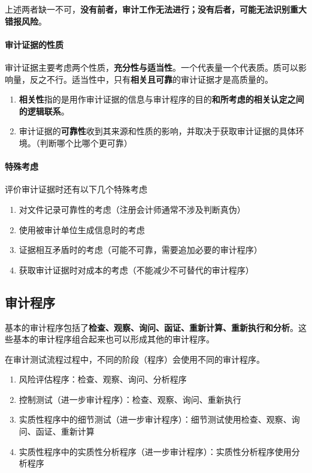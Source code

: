 \documentclass[UTF8,12pt]{ctexart}
\numberwithin{equation}{section} %
\numberwithin{figure}{section}
\numberwithin{table}{section}
\begin{document}
	上述两者缺一不可，\textbf{没有前者，审计工作无法进行；没有后者，可能无法识别重大错报风险}。
	
	\paragraph{审计证据的性质}审计证据主要考虑两个性质，\textbf{充分性与适当性}。一个代表量一个代表质。质可以影响量，反之不行。适当性中，只有\textbf{相关且可靠}的审计证据才是高质量的。
	\begin{enumerate}
		\item \textbf{相关性}指的是用作审计证据的信息与审计程序的目的\textbf{和所考虑的相关认定之间的逻辑联系}。
		
		\item 审计证据的\textbf{可靠性}收到其来源和性质的影响，并取决于获取审计证据的具体环境。（判断哪个比哪个更可靠）
	\end{enumerate}
	
	\paragraph{特殊考虑}评价审计证据时还有以下几个特殊考虑
	\begin{enumerate}
		\item 对文件记录可靠性的考虑（注册会计师通常不涉及判断真伪）
		
		\item 使用被审计单位生成信息时的考虑
		
		\item 证据相互矛盾时的考虑（可能不可靠，需要追加必要的审计程序）
		
		\item 获取审计证据时对成本的考虑（不能减少不可替代的审计程序）
	\end{enumerate}
	
	\subsection{审计程序}
	基本的审计程序包括了\textbf{检查、观察、询问、函证、重新计算、重新执行和分析}。这些基本的审计程序组合起来也可以形成其他的审计程序。
	
	在审计测试流程过程中，不同的阶段（程序）会使用不同的审计程序。
	\begin{enumerate}
		\item 风险评估程序：检查、观察、询问、分析程序
		
		\item 控制测试（进一步审计程序）：检查、观察、询问、重新执行
		
		\item 实质性程序中的细节测试（进一步审计程序）：细节测试使用检查、观察、询问、函证、重新计算
		
		\item 实质性程序中的实质性分析程序（进一步审计程序）：实质性分析程序使用分析程序
	\end{enumerate}
	
\end{document}
